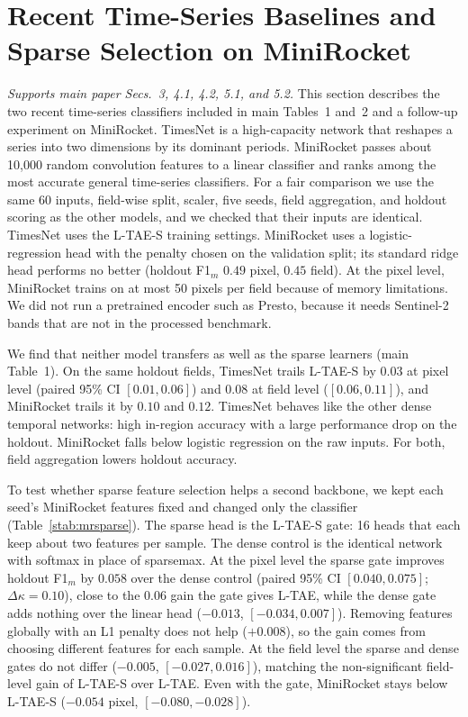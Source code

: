 \documentclass[preprint,authoryear,3p]{elsarticle}
\begin{document}
\section{Recent Time-Series Baselines and Sparse Selection on MiniRocket}
\label{sec:recent}
\emph{Supports main paper Secs.~3, 4.1, 4.2, 5.1, and 5.2.}
This section describes the two recent time-series classifiers included in main Tables~1 and~2 and a follow-up experiment on MiniRocket. TimesNet \citep{timesnet2023} is a high-capacity network that reshapes a series into two dimensions by its dominant periods. MiniRocket \citep{minirocket2021} passes about 10{,}000 random convolution features to a linear classifier and ranks among the most accurate general time-series classifiers. For a fair comparison we use the same 60 inputs, field-wise split, scaler, five seeds, field aggregation, and holdout scoring as the other models, and we checked that their inputs are identical. TimesNet uses the L-TAE-S training settings. MiniRocket uses a logistic-regression head with the penalty chosen on the validation split; its standard ridge head performs no better (holdout F1$_m$ $0.49$ pixel, $0.45$ field). At the pixel level, MiniRocket trains on at most 50 pixels per field because of memory limitations. We did not run a pretrained encoder such as Presto, because it needs Sentinel-2 bands that are not in the processed benchmark.

We find that neither model transfers as well as the sparse learners (main Table~1). On the same holdout fields, TimesNet trails L-TAE-S by $0.03$ at pixel level (paired 95\% CI $[0.01, 0.06]$) and $0.08$ at field level ($[0.06, 0.11]$), and MiniRocket trails it by $0.10$ and $0.12$. TimesNet behaves like the other dense temporal networks: high in-region accuracy with a large performance drop on the holdout. MiniRocket falls below logistic regression on the raw inputs. For both, field aggregation lowers holdout accuracy.

To test whether sparse feature selection helps a second backbone, we kept each seed's MiniRocket features fixed and changed only the classifier (Table~\ref{stab:mrsparse}). The sparse head is the L-TAE-S gate: 16 heads that each keep about two features per sample. The dense control is the identical network with softmax in place of sparsemax. At the pixel level the sparse gate improves holdout F1$_m$ by $0.058$ over the dense control (paired 95\% CI $[0.040, 0.075]$; $\Delta\kappa=0.10$), close to the $0.06$ gain the gate gives L-TAE, while the dense gate adds nothing over the linear head ($-0.013$, $[-0.034, 0.007]$). Removing features globally with an L1 penalty does not help ($+0.008$), so the gain comes from choosing different features for each sample. At the field level the sparse and dense gates do not differ ($-0.005$, $[-0.027, 0.016]$), matching the non-significant field-level gain of L-TAE-S over L-TAE. Even with the gate, MiniRocket stays below L-TAE-S ($-0.054$ pixel, $[-0.080, -0.028]$).
\end{document}
